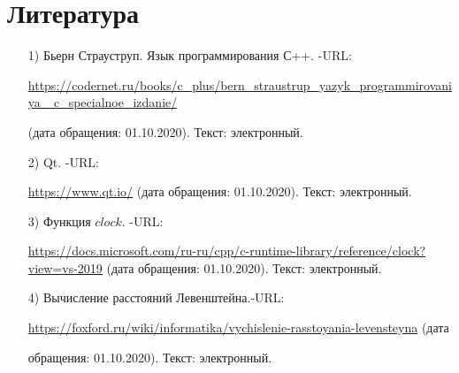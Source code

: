 \documentclass[12pt]{report}
\begin{document}
\chapter*{Литература}

\begin{enumerate}
	\label{CPlusPlus}
	\item[1)] Бьерн Страуструп. Язык программирования С++. -URL:\par 
	\href{https://codernet.ru/books/c_plus/bern_straustrup_yazyk_programmirovaniya_c_specialnoe_izdanie/}
	{https://codernet.ru/books/c\_plus/bern\_straustrup\_yazyk\_programmirovaniya\_
		c\_specialnoe\_izdanie/}\par(дата обращения:
	01.10.2020). Текст: электронный.
	
	\label{Cute}
	\item[2)] Qt. -URL:\par
	\href{https://www.qt.io/}{https://www.qt.io/} (дата обращения: 01.10.2020). Текст: электронный.
	
	\label{CLOCK}
	\item[3)] Функция $clock$. -URL:\par
	\href{https://docs.microsoft.com/ru-ru/cpp/c-runtime-library/reference/clock?view=vs-2019}{https://docs.microsoft.com/ru-ru/cpp/c-runtime-library/reference/clock?view=vs-2019} (дата обращения:
	01.10.2020). Текст: электронный.
	
	\item[4)] Вычисление расстояний Левенштейна.-URL:\par
	\href{https://foxford.ru/wiki/informatika/vychislenie-rasstoyania-levensteyna}{https://foxford.ru/wiki/informatika/vychislenie-rasstoyania-levensteyna} (дата \par обращения:
	01.10.2020). Текст: электронный.
\end{enumerate}
\end{document}
